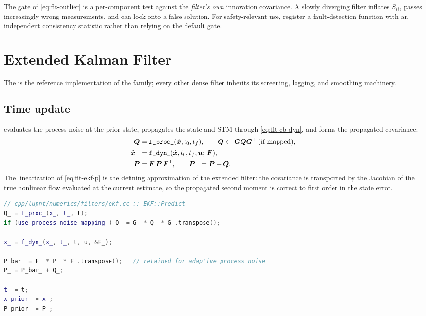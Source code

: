 \begin{lupntwarning}
The gate of \cref{eq:flt-outlier} is a per-component test against the
\emph{filter's own} innovation covariance. A slowly diverging filter inflates
$S_{ii}$, passes increasingly wrong measurements, and can lock onto a false
solution. For safety-relevant use, register a fault-detection function with an
independent consistency statistic rather than relying on the default gate.
\end{lupntwarning}

\section{Extended Kalman Filter}
\label{sec:flt-ekf}

The  is the reference implementation of the family; every other dense
filter inherits its screening, logging, and smoothing machinery.

\subsection{Time update}

 evaluates the process noise at the prior state, propagates
the state and STM through \cref{eq:flt-cb-dyn}, and forms the propagated
covariance:
\begin{align}
  \label{eq:flt-ekf-q}
  \bm{Q} &= \texttt{f\_proc\_}(\hat{\bm{x}}, t_0, t_f),
  \qquad
  \bm{Q} \leftarrow \bm{G}\bm{Q}\bm{G}^{\mathsf{T}} \ \text{(if mapped)}, \\
  \label{eq:flt-ekf-x}
  \hat{\bm{x}}^{-} &= \texttt{f\_dyn\_}(\hat{\bm{x}}, t_0, t_f, \bm{u};\, \bm{F}), \\
  \label{eq:flt-ekf-p}
  \bar{\bm{P}} &= \bm{F}\,\bm{P}\,\bm{F}^{\mathsf{T}},
  \qquad
  \bm{P}^{-} = \bar{\bm{P}} + \bm{Q} .
\end{align}
The linearization of \cref{eq:flt-ekf-p} is the defining approximation of the
extended filter: the covariance is transported by the Jacobian of the true
nonlinear flow evaluated at the current estimate, so the propagated second
moment is correct to first order in the state error.

\begin{lstlisting}[language=cpp, caption={EKF time update.},
                   label={lst:flt-ekf-predict}]
// cpp/lupnt/numerics/filters/ekf.cc :: EKF::Predict
Q_ = f_proc_(x_, t_, t);
if (use_process_noise_mapping_) Q_ = G_ * Q_ * G_.transpose();

x_ = f_dyn_(x_, t_, t, u, &F_);

P_bar_ = F_ * P_ * F_.transpose();   // retained for adaptive process noise
P_ = P_bar_ + Q_;

t_ = t;
x_prior_ = x_;
P_prior_ = P_;
\end{lstlisting}

